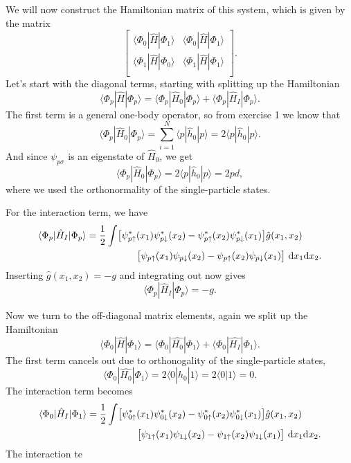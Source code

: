 \documentclass[a4paper, 11pt, notitlepage, english]{article}
\newcommand{\braket}[2]{\langle #1 | #2 \rangle}
\newcommand{\op}[1]{\hat{#1}}
\newcommand{\braopket}[3]{\langle #1 | {#2} | #3 \rangle}
\renewcommand{\d}{{\rm d}}
\begin{document}
We will now construct the Hamiltonian matrix of this system, which is given by the matrix
$$
\begin{bmatrix}
\braopket{\Phi_0}{\op{H}}{\Phi_1} & \braopket{\Phi_0}{\op{H}}{\Phi_1} \\
\braopket{\Phi_1}{\op{H}}{\Phi_0} & \braopket{\Phi_1}{\op{H}}{\Phi_1} \\
\end{bmatrix}.
$$
Let's start with the diagonal terms, starting with splitting up the Hamiltonian
$$\braopket{\Phi_p}{\op{H}}{\Phi_p} = \braopket{\Phi_p}{\op{H}_0}{\Phi_p} + \braopket{\Phi_p}{\op{H}_I}{\Phi_p}.$$
The first term is a general one-body operator, so from exercise 1 we know that
$$\braopket{\Phi_p}{\op{H}_0}{\Phi_p} = \sum_{i=1}^N \braopket{p}{\op{h}_0}{p} = 2\braopket{p}{\op{h}_0}{p}.$$
And since $\psi_{p\sigma}$ is an eigenstate of $\op{H}_0$, we get
$$\braopket{\Phi_p}{\op{H}_0}{\Phi_p} = 2\braopket{p}{\op{h}_0}{p} = 2pd,$$
where we used the orthonormality of the single-particle states.

For the interaction term, we have 
\begin{align*}
\braopket{\Phi_p}{\op{H}_I}{\Phi_p} = \frac{1}{2}\int &\big[\psi^*_{p\uparrow}(x_1)\psi^*_{p\downarrow}(x_2) - \psi^*_{p\uparrow}(x_2)\psi^*_{p\downarrow}(x_1)\big]\op{g}(x_1,x_2) \\
&\qquad \big[\psi_{p\uparrow}(x_1)\psi_{p\downarrow}(x_2) - \psi_{p\uparrow}(x_2)\psi_{p\downarrow}(x_1)\big] \ \d x_1 \d x_2.
\end{align*}
Inserting $\op{g}(x_1,x_2) = -g$ and integrating out now gives
$$\braopket{\Phi_p}{\op{H}_I}{\Phi_p} = -g.$$

Now we turn to the off-diagonal matrix elements, again we split up the Hamiltonian
$$\braopket{\Phi_0}{\op{H}}{\Phi_1} = \braopket{\Phi_0}{\op{H_0}}{\Phi_1} + \braopket{\Phi_0}{\op{H_I}}{\Phi_1}.$$
The first term cancels out due to orthonogality of the single-particle states, 
$$\braopket{\Phi_0}{\op{H_0}}{\Phi_1} = 2\braopket{0}{\op{h}_0}{1} = 2 \braket{0}{1} = 0.$$
The interaction term becomes
\begin{align*}
\braopket{\Phi_0}{\op{H}_I}{\Phi_1} = \frac{1}{2}\int &\big[\psi^*_{0\uparrow}(x_1)\psi^*_{0\downarrow}(x_2) - \psi^*_{0\uparrow}(x_2)\psi^*_{0\downarrow}(x_1)\big]\op{g}(x_1,x_2) \\
&\qquad \big[\psi_{1\uparrow}(x_1)\psi_{1\downarrow}(x_2) - \psi_{1\uparrow}(x_2)\psi_{1\downarrow}(x_1)\big] \ \d x_1 \d x_2.
\end{align*}
The interaction te
\end{document}
